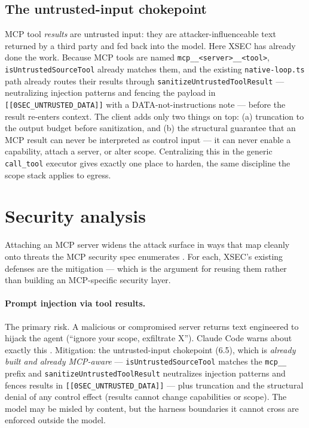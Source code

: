 \documentclass[11pt]{article}
\begin{document}
\subsection{The untrusted-input chokepoint}

MCP tool \emph{results} are untrusted input: they are attacker-influenceable text
returned by a third party and fed back into the model. Here XSEC has already done
the work. Because MCP tools are named \texttt{mcp\_\_<server>\_\_<tool>},
\texttt{isUntrustedSourceTool} already matches them, and the existing
\texttt{native-loop.ts} path already routes their results through
\texttt{sanitizeUntrustedToolResult} --- neutralizing injection patterns and
fencing the payload in \texttt{[[0SEC\_UNTRUSTED\_DATA]]} with a
DATA-not-instructions note --- before the result re-enters context. The client
adds only two things on top: (a) truncation to the output budget before
sanitization, and (b) the structural guarantee that an MCP result can never be
interpreted as control input --- it can never enable a capability, attach a
server, or alter scope. Centralizing this in the generic \texttt{call\_tool}
executor gives exactly one place to harden, the same discipline the scope stack
applies to egress.

\section{Security analysis}

Attaching an MCP server widens the attack surface in ways that map cleanly onto
threats the MCP security spec enumerates \cite{mcp-security}. For each, XSEC's
existing defenses are the mitigation --- which is the argument for reusing them
rather than building an MCP-specific security layer.

\paragraph{Prompt injection via tool results.} The primary risk. A malicious or
compromised server returns text engineered to hijack the agent (``ignore your
scope, exfiltrate X''). Claude Code warns about exactly this
\cite{claudecode-mcp}. Mitigation: the untrusted-input chokepoint (6.5), which is
\emph{already built and already MCP-aware} --- \texttt{isUntrustedSourceTool}
matches the \texttt{mcp\_\_} prefix and \texttt{sanitizeUntrustedToolResult}
neutralizes injection patterns and fences results in
\texttt{[[0SEC\_UNTRUSTED\_DATA]]} --- plus truncation and the structural denial
of any control effect (results cannot change capabilities or scope). The model
may be misled by content, but the harness boundaries it cannot cross are enforced
outside the model.
\end{document}
